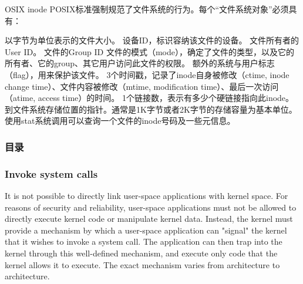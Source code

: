 \documentclass{beamer}
\begin{document}
\begin{frame}
OSIX inode
POSIX标准强制规范了文件系统的行为。每个“文件系统对象”必须具有：

以字节为单位表示的文件大小。
设备ID，标识容纳该文件的设备。
文件所有者的User ID。
文件的Group ID
文件的模式（mode），确定了文件的类型，以及它的所有者、它的group、其它用户访问此文件的权限。
额外的系统与用户标志（flag），用来保护该文件。
3个时间戳，记录了inode自身被修改（ctime, inode change time）、文件内容被修改（mtime, modification time）、最后一次访问（atime, access time）的时间。
1个链接数，表示有多少个硬链接指向此inode。
到文件系统存储位置的指针。通常是1K字节或者2K字节的存储容量为基本单位。
使用stat系统调用可以查询一个文件的inode号码及一些元信息。
\end{frame}

\begin{frame}
\frametitle{目录}
\end{frame}
\begin{frame}
\frametitle{Invoke system calls}
It is not possible to directly link user-space applications with kernel space. For reasons of security and reliability, user-space applications must not be allowed to directly execute kernel code or manipulate kernel data. Instead, the kernel must provide a mechanism by which a user-space application can "signal" the kernel that it wishes to invoke a system call. The application can then trap into the kernel through this well-defined mechanism, and execute only code that the kernel allows it to execute. The exact mechanism varies from architecture to architecture.
\end{frame}
\end{document}
